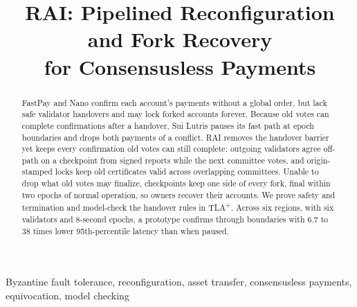 \documentclass[conference]{IEEEtran}
\begin{document}
\title{RAI: Pipelined Reconfiguration and Fork Recovery\\for Consensusless Payments}
\author{
}
\maketitle

\begin{abstract}
FastPay and Nano confirm each account's payments without a global order, but lack safe validator handovers and may lock forked accounts forever. Because old votes can complete confirmations after a handover, Sui Lutris pauses its fast path at epoch boundaries and drops both payments of a conflict. RAI removes the handover barrier yet keeps every confirmation old votes can still complete: outgoing validators agree off-path on a checkpoint from signed reports while the next committee votes, and origin-stamped locks keep old certificates valid across overlapping committees. Unable to drop what old votes may finalize, checkpoints keep one side of every fork, final within two epochs of normal operation, so owners recover their accounts. We prove safety and termination and model-check the handover rules in TLA\textsuperscript{+}. Across six regions, with six validators and 8-second epochs, a prototype confirms through boundaries with 6.7 to 38 times lower 95th-percentile latency than when paused.
\end{abstract}

\begin{IEEEkeywords}
Byzantine fault tolerance, reconfiguration, asset transfer, consensusless payments, equivocation, model checking
\end{IEEEkeywords}
\end{document}
